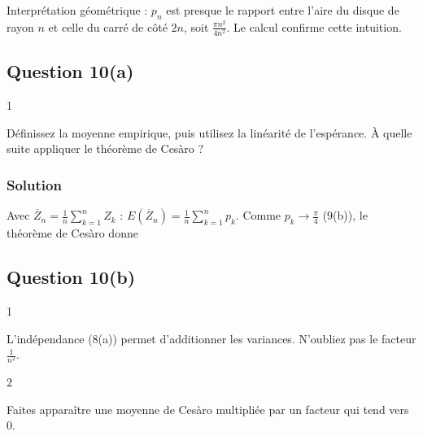 \documentclass[11pt,a4paper]{article}
\newcommand{\equationajustee}[1]{%
  \sbox{\boiteequation}{$\displaystyle #1$}%
  \ifdim\wd\boiteequation>\linewidth
    \[\resizebox{\linewidth}{!}{\usebox{\boiteequation}}\]%
  \else
    \[#1\]%
  \fi}
\begin{document}
\begin{methode}

Interprétation géométrique : \(p_n\) est presque le rapport entre l'aire du disque de rayon \(n\) et celle du carré de côté \(2n\), soit \(\frac{\pi n^2}{4n^2}\). Le calcul confirme cette intuition.

\end{methode}

\hypertarget{question-10a}{%
\subsection{Question 10(a)}\label{question-10a}}

\begin{indication}{1}

Définissez la moyenne empirique, puis utilisez la linéarité de l'espérance. À quelle suite appliquer le théorème de Cesàro ?

\end{indication}

\hypertarget{solution-20}{%
\subsubsection{Solution}\label{solution-20}}

Avec \(\overline Z_n=\frac1n\sum_{k=1}^nZ_k\) : \(E(\overline Z_n)=\frac1n\sum_{k=1}^np_k\). Comme \(p_k\to\frac\pi4\) (9(b)), le théorème de Cesàro donne

\equationajustee{\boxed{E(\overline Z_n)\xrightarrow[n\to+\infty]{}\frac\pi4.}}

\hypertarget{question-10b}{%
\subsection{Question 10(b)}\label{question-10b}}

\begin{indication}{1}

L'indépendance (8(a)) permet d'additionner les variances. N'oubliez pas le facteur \(\frac1{n^2}\).

\end{indication}

\begin{indication}{2}

Faites apparaître une moyenne de Cesàro multipliée par un facteur qui tend vers \(0\).

\end{indication}
\end{document}
